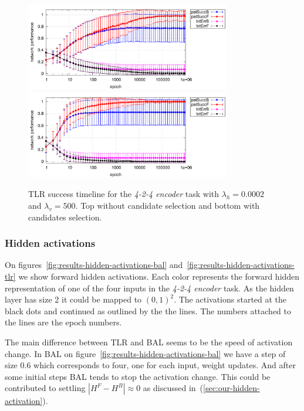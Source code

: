 \begin{figure}[H]
  \centering
  \includegraphics[width=0.8\textwidth]{img/tlr-auto4-best-perf.pdf}\\
  \includegraphics[width=0.8\textwidth]{img/tlr-auto4-best-can.pdf}      
  \caption{TLR success timeline for the \emph{4-2-4 encoder} task with $\lambda_h=0.0002$ and $\lambda_v=500$. Top without candidate selection and bottom with candidates selection.}
  \label{fig:results-tlr-auto4-epoch} 
\end{figure}

\subsubsection{Hidden activations} 

On figures~\ref{fig:results-hidden-activations-bal} and~\ref{fig:results-hidden-activations-tlr} we show forward hidden activations. Each color represents the forward hidden representation of one of the four inputs in the \emph{4-2-4 encoder} task. As the hidden layer has size 2 it could be mapped to $(0,1)^2$. The activations started at the black dots and continued as outlined by the the lines. The numbers attached to the lines are the epoch numbers. 

The main difference between TLR and BAL seems to be the speed of activation change. In BAL on figure~\ref{fig:results-hidden-activations-bal} we have a step of size 0.6 which corresponds to four, one for each input, weight updates. And after some initial steps BAL tends to stop the activation change. This could be contributed to settling $|H^F-H^B| \approx 0$ as discussed in~(\ref{sec:our-hidden-activation}). 

